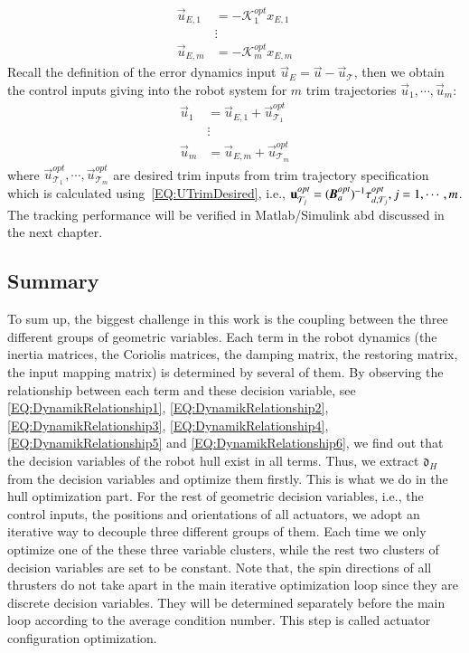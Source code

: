 \begin{align}
\vec{u}_{E,1}&=-\mathcal{K}_{1}^{opt}x_{E,1} \nonumber \\
&\vdots \nonumber \\
\vec{u}_{E,m}&=-\mathcal{K}_{m}^{opt}x_{E,m}
\end{align}
Recall the definition of the error dynamics input $\vec{u}_{E}=\vec{u}-\vec{u}_{\mathcal{T}}$, then we obtain the control inputs giving into the robot system for $m$ trim trajectories $\vec{u}_{1}, \cdots, \vec{u}_{m}$:
\begin{align}
\vec{u}_{1}&=\vec{u}_{E,1}+\vec{u}_{\mathcal{T}_{1}}^{opt} \nonumber \\
&\vdots \nonumber \\
\vec{u}_{m}&=\vec{u}_{E,m}+\vec{u}_{\mathcal{T}_{m}}^{opt}
\end{align}
where $\vec{u}_{\mathcal{T}_{1}}^{opt}, \cdots, \vec{u}_{\mathcal{T}_{m}}^{opt}$ are desired trim inputs from trim trajectory specification which is calculated using~\ref{EQ:UTrimDesired}, i.e., $\vec{u}_{\mathcal{T}_{j}}^{opt}=(\emph{\textbf{B}}_{a}^{opt})^{-1}
\vec{\tau}_{d,\mathcal{T}_{j}}^{opt}, j=1, \cdots, m$. The tracking performance will be verified in Matlab/Simulink abd discussed in the next chapter.

\subsection{Summary} 
To sum up, the biggest challenge in this work is the coupling between the three different groups of geometric variables. Each term in the robot dynamics (the inertia matrices, the Coriolis matrices, the damping matrix, the restoring matrix, the input mapping matrix) is determined by several of them. By observing the relationship between each term and these decision variable, see \ref{EQ:DynamikRelationship1}, \ref{EQ:DynamikRelationship2}, \ref{EQ:DynamikRelationship3}, \ref{EQ:DynamikRelationship4}, \ref{EQ:DynamikRelationship5} and \ref{EQ:DynamikRelationship6}, we find out that the decision variables of the robot hull exist in all terms. Thus, we extract $\mathfrak{d}_{H}$ from the decision variables and optimize them firstly. This is what we do in the hull optimization part. For the rest of geometric decision variables, i.e., the control inputs, the positions and orientations of all actuators, we adopt an iterative way to decouple three different groups of them. Each time we only optimize one of the these three variable clusters, while the rest two clusters of decision variables are set to be constant. Note that, the spin directions of all thrusters do not take apart in the main iterative optimization loop since they are discrete decision variables. They will be determined separately before the main loop according to the average condition number. This step is called actuator configuration optimization. 


